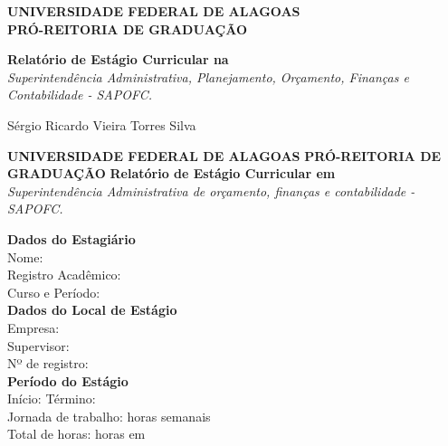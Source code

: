 \documentclass[12pt,a4paper]{article}
\begin{document}
	
	\begin{titlepage}
		\centering
		\large
		\textbf{UNIVERSIDADE FEDERAL DE ALAGOAS} \\
		\textbf{PRÓ-REITORIA DE GRADUAÇÃO} \\
		\vfill
		
		\Huge \textbf{Relatório de Estágio Curricular na} \\
		\vspace{0.5cm}
		\LARGE \textit{Superintendência Administrativa, Planejamento, Orçamento, Finanças e Contabilidade - SAPOFC.} \\
		\vfill
		
		\Large Sérgio Ricardo Vieira Torres Silva \\
		\vspace{1.5cm}
	\end{titlepage}
	
	\thispagestyle{empty}
	\begin{center}
		\textbf{UNIVERSIDADE FEDERAL DE ALAGOAS} 
		\textbf{PRÓ-REITORIA DE GRADUAÇÃO} 
		\vspace{1cm}
		\textbf{Relatório de Estágio Curricular em} \\
		\textit{Superintendência Administrativa de orçamento, finanças e contabilidade - SAPOFC.}
	\end{center}
	
	\vspace{1cm}
	
	\noindent \textbf{Dados do Estagiário} \\
	Nome: \underline{\hspace{12cm}} \\
	Registro Acadêmico: \underline{\hspace{10cm}} \\
	Curso e Período: \underline{\hspace{10cm}} \\
	
	\vspace{0.5cm}
	\noindent \textbf{Dados do Local de Estágio} \\
	Empresa: \underline{\hspace{13cm}} \\
	Supervisor: \underline{\hspace{12cm}} \\
	Nº de registro: \underline{\hspace{10cm}} \\
	
	\vspace{0.5cm}
	\noindent \textbf{Período do Estágio} \\
	Início: \underline{\hspace{4cm}} \quad Término: \underline{\hspace{4cm}} \\
	Jornada de trabalho: \underline{\hspace{5cm}} horas semanais \\
	Total de horas: \underline{\hspace{4cm}} horas em \underline{\hspace{6cm}} \\
	
\end{document}

